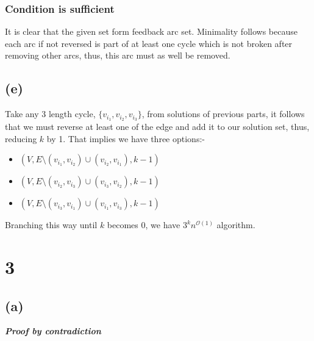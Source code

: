 \documentclass[12pt,3p]{elsarticle}
\begin{document}
\subsubsection{Condition is sufficient}

It is clear that the given set form feedback arc set. Minimality follows because each arc if not reversed is part of at least one cycle which is not broken after removing other arcs, thus, this arc must as well be removed.

\subsection{(e)}

Take any 3 length cycle, $\{v_{i_1}, v_{i_2}, v_{i_3}\}$, from solutions of previous parts, it follows that we must reverse at least one of the edge and add it to our solution set, thus, reducing $k$ by 1. That implies we have three options:-

\begin{itemize}
  \item $(V, E \setminus (v_{i_1}, v_{i_2}) \cup (v_{i_2}, v_{i_1}), k - 1)$
  \item $(V, E \setminus (v_{i_2}, v_{i_3}) \cup (v_{i_3}, v_{i_2}), k - 1)$
  \item $(V, E \setminus (v_{i_3}, v_{i_1}) \cup (v_{i_1}, v_{i_3}), k - 1)$
\end{itemize}

Branching this way until $k$ becomes 0, we have $3^kn^{\mathcal{O}(1)}$ algorithm.



\section{3}

\subsection{(a)}
\textit{\textbf{Proof by contradiction}}
\end{document}
